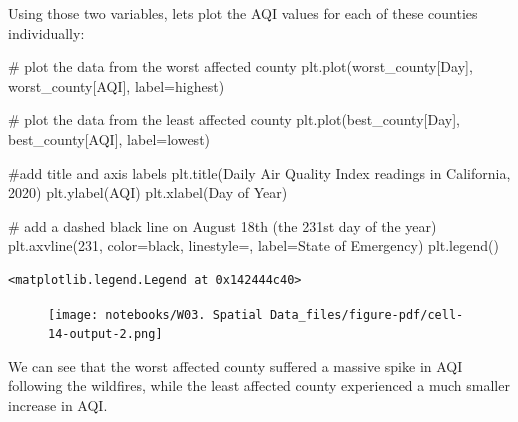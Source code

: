 \documentclass[
  letterpaper,
  DIV=11,
  numbers=noendperiod]{scrreprt}
\newenvironment{Shaded}{\begin{snugshade}}{\end{snugshade}}
\newcommand{\CommentTok}[1]{\textcolor[rgb]{0.37,0.37,0.37}{#1}}
\newcommand{\DecValTok}[1]{\textcolor[rgb]{0.68,0.00,0.00}{#1}}
\newcommand{\NormalTok}[1]{\textcolor[rgb]{0.00,0.23,0.31}{#1}}
\newcommand{\OperatorTok}[1]{\textcolor[rgb]{0.37,0.37,0.37}{#1}}
\newcommand{\StringTok}[1]{\textcolor[rgb]{0.13,0.47,0.30}{#1}}
\begin{document}
Using those two variables, lets plot the AQI values for each of these
counties individually:

\begin{Shaded}
\begin{Highlighting}[]
\CommentTok{\# plot the data from the worst affected county}
\NormalTok{plt.plot(worst\_county[}\StringTok{\textquotesingle{}Day\textquotesingle{}}\NormalTok{], worst\_county[}\StringTok{\textquotesingle{}AQI\textquotesingle{}}\NormalTok{], label}\OperatorTok{=}\NormalTok{highest)}

\CommentTok{\# plot the data from the least affected county}
\NormalTok{plt.plot(best\_county[}\StringTok{\textquotesingle{}Day\textquotesingle{}}\NormalTok{], best\_county[}\StringTok{\textquotesingle{}AQI\textquotesingle{}}\NormalTok{], label}\OperatorTok{=}\NormalTok{lowest)}

\CommentTok{\#add title and axis labels}
\NormalTok{plt.title(}\StringTok{\textquotesingle{}Daily Air Quality Index readings in California, 2020\textquotesingle{}}\NormalTok{)}
\NormalTok{plt.ylabel(}\StringTok{\textquotesingle{}AQI\textquotesingle{}}\NormalTok{)}
\NormalTok{plt.xlabel(}\StringTok{\textquotesingle{}Day of Year\textquotesingle{}}\NormalTok{)}

\CommentTok{\# add a dashed black line on August 18th (the 231st day of the year)}
\NormalTok{plt.axvline(}\DecValTok{231}\NormalTok{, color}\OperatorTok{=}\StringTok{\textquotesingle{}black\textquotesingle{}}\NormalTok{, linestyle}\OperatorTok{=}\StringTok{\textquotesingle{}{-}{-}\textquotesingle{}}\NormalTok{, label}\OperatorTok{=}\StringTok{\textquotesingle{}State of Emergency\textquotesingle{}}\NormalTok{)}
\NormalTok{plt.legend()}
\end{Highlighting}
\end{Shaded}

\begin{verbatim}
<matplotlib.legend.Legend at 0x142444c40>
\end{verbatim}

\begin{figure}[H]

{\centering \texttt{[image: notebooks/W03. Spatial Data\_files/figure-pdf/cell-14-output-2.png]}

}

\end{figure}

We can see that the worst affected county suffered a massive spike in
AQI following the wildfires, while the least affected county experienced
a much smaller increase in AQI.
\end{document}
